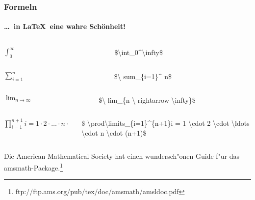 \begin{frame}
\frametitle{Formeln}
\framesubtitle{\ldots ~in \LaTeX ~eine wahre Sch\"onheit!}
\begin{columns}
\begin{column}{.4\textwidth}
\flushright
$\int_0^\infty$
\end{column}
\begin{column}{.6\textwidth}
\flushleft
{\ttfamily\color{unibayellowI}\$\color{nounibaredI}\textbackslash\color{nounibaredI}int\_\color{black}0\color{nounibaredI}\textasciicircum \textbackslash infty\color{unibayellowI}\$}
\end{column}
\end{columns}
\begin{columns}
\begin{column}{.4\textwidth}
\flushright
$\sum_{i=1}^n$
\end{column}
\begin{column}{.6\textwidth}
\flushleft
{\ttfamily \color{unibayellowI}\$\color{nounibaredI}\textbackslash
\color{nounibaredI}sum\_\color{black}\{i=1\}\color{nounibaredI}\textasciicircum
\color{black}n\color{unibayellowI}\$}
\end{column}
\end{columns}

\begin{columns}
\begin{column}{.4\textwidth}
\flushright
$\lim_{n \rightarrow \infty}$
\end{column}
\begin{column}{.6\textwidth}
\flushleft
{\ttfamily \color{unibayellowI}\$\color{nounibaredI}\textbackslash
\color{nounibaredI}lim\_\color{black}\{n \color{nounibaredI}\textbackslash
\color{nounibaredI}rightarrow \color{nounibaredI}\textbackslash infty\color{black}\}\color{unibayellowI}\$}
\end{column}
\end{columns}

\begin{columns}
\begin{column}{.4\textwidth}
\flushright
$\prod\limits_{i=1}^{n+1}i = 1 \cdot 2 \cdot \ldots \cdot n \cdot (n+1)$
\end{column}
\begin{column}{.6\textwidth}
\flushleft
{\ttfamily \color{unibayellowI}\$	\color{nounibaredI}\textbackslash\color{nounibaredI}prod\textbackslash  limits\_\color{black}\{i=1\}\color{nounibaredI}\^{}\color{black}\{n+1\}i = 1 \color{nounibaredI}\textbackslash \color{nounibaredI}cdot \color{black}2 \color{nounibaredI}\textbackslash \color{nounibaredI}cdot \color{nounibaredI}\textbackslash \color{nounibaredI}ldots \color{nounibaredI}\textbackslash\color{nounibaredI}cdot \color{black}n \color{nounibaredI}\textbackslash \color{nounibaredI}cdot \color{black}(n+1)\color{unibayellowI}\$}
\end{column}
\end{columns}
\bigskip
Die  American Mathematical Society hat einen wundersch"onen Guide f"ur das {\ttfamily amsmath}-Package.\footnote{ftp://ftp.ams.org/pub/tex/doc/amsmath/amsldoc.pdf}
\end{frame}